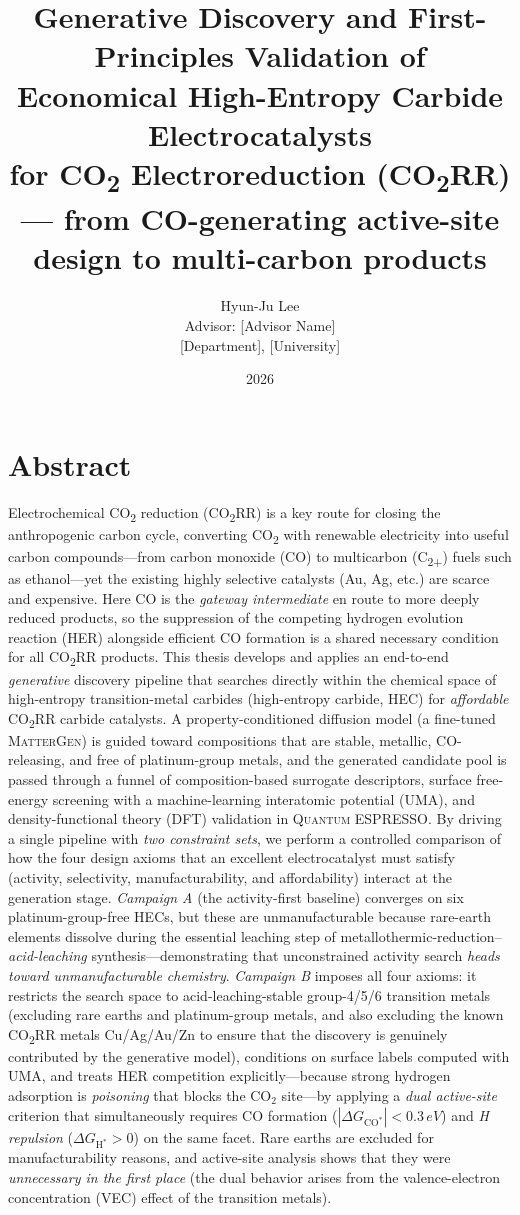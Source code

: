 \documentclass[11pt,a4paper]{report}
\title{\bfseries Generative Discovery and First-Principles Validation of\\
Economical High-Entropy Carbide Electrocatalysts\\
for CO\textsubscript{2} Electroreduction (CO\textsubscript{2}RR)\\[2pt]
\normalsize\mdseries --- from CO-generating active-site design to multi-carbon products}
\author{Hyun-Ju Lee \\[4pt]
\small Advisor: [Advisor Name]\\
\small [Department], [University]}
\date{2026}
\providecommand{\SI}[2]{#1\,#2}
\newcommand{\dGCO}{\Delta G_{\mathrm{CO^*}}}
\newcommand{\dGH}{\Delta G_{\mathrm{H^*}}}
\begin{document}
\maketitle
\chapter*{Abstract}
Electrochemical CO\textsubscript{2} reduction (CO\textsubscript{2}RR) is a key route for closing the anthropogenic carbon cycle, converting CO\textsubscript{2} with renewable electricity into useful carbon compounds---from carbon monoxide (CO) to multicarbon (C\textsubscript{2+}) fuels such as ethanol---yet the existing highly selective catalysts (Au, Ag, etc.) are scarce and expensive. Here CO is the \emph{gateway intermediate} en route to more deeply reduced products, so the suppression of the competing hydrogen evolution reaction (HER) alongside efficient CO formation is a shared necessary condition for all CO\textsubscript{2}RR products. This thesis develops and applies an end-to-end \emph{generative} discovery pipeline that searches directly within the chemical space of high-entropy transition-metal carbides (high-entropy carbide, HEC) for \emph{affordable} CO\textsubscript{2}RR carbide catalysts. A property-conditioned diffusion model (a fine-tuned \textsc{MatterGen}) is guided toward compositions that are stable, metallic, CO-releasing, and free of platinum-group metals, and the generated candidate pool is passed through a funnel of composition-based surrogate descriptors, surface free-energy screening with a machine-learning interatomic potential (UMA), and density-functional theory (DFT) validation in \textsc{Quantum ESPRESSO}. By driving a single pipeline with \emph{two constraint sets}, we perform a controlled comparison of how the four design axioms that an excellent electrocatalyst must satisfy (activity, selectivity, manufacturability, and affordability) interact at the generation stage. \emph{Campaign A} (the activity-first baseline) converges on six platinum-group-free HECs, but these are unmanufacturable because rare-earth elements dissolve during the essential leaching step of metallothermic-reduction--\emph{acid-leaching} synthesis---demonstrating that unconstrained activity search \emph{heads toward unmanufacturable chemistry}. \emph{Campaign B} imposes all four axioms: it restricts the search space to acid-leaching-stable group-4/5/6 transition metals (excluding rare earths and platinum-group metals, and also excluding the known CO\textsubscript{2}RR metals Cu/Ag/Au/Zn to ensure that the discovery is genuinely contributed by the generative model), conditions on surface labels computed with UMA, and treats HER competition explicitly---because strong hydrogen adsorption is \emph{poisoning} that blocks the CO$_2$ site---by applying a \emph{dual active-site} criterion that simultaneously requires CO formation ($|\dGCO|<\SI{0.3}{eV}$) and \emph{H repulsion} ($\dGH>0$) on the same facet. Rare earths are excluded for manufacturability reasons, and active-site analysis shows that they were \emph{unnecessary in the first place} (the dual behavior arises from the valence-electron concentration (VEC) effect of the transition metals). 
\end{document}
